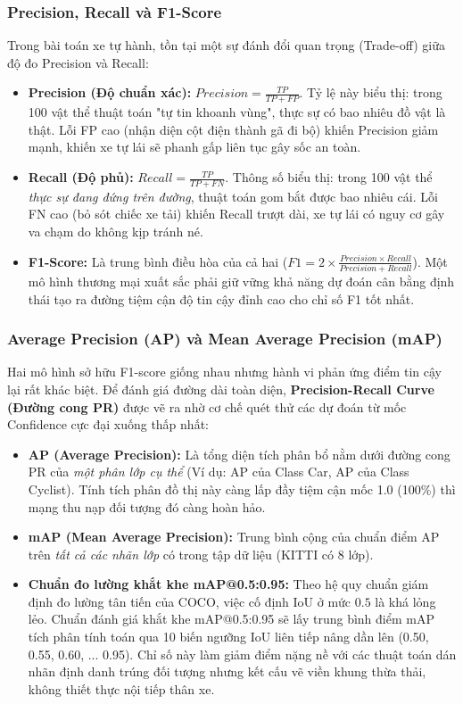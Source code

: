 \documentclass[a4paper]{article}
\theoremstyle{definition}
\begin{document}
\subsubsection{Precision, Recall và F1-Score}
Trong bài toán xe tự hành, tồn tại một sự đánh đổi quan trọng (Trade-off) giữa độ đo Precision và Recall:
\begin{itemize}
	\item \textbf{Precision (Độ chuẩn xác):} $Precision = \frac{TP}{TP + FP}$. Tỷ lệ này biểu thị: trong 100 vật thể thuật toán "tự tin khoanh vùng", thực sự có bao nhiêu đồ vật là thật. Lỗi FP cao (nhận diện cột điện thành gã đi bộ) khiến Precision giảm mạnh, khiến xe tự lái sẽ phanh gấp liên tục gây sốc an toàn.
	\item \textbf{Recall (Độ phủ):} $Recall = \frac{TP}{TP + FN}$. Thông số biểu thị: trong 100 vật thể \textit{thực sự đang đứng trên đường}, thuật toán gom bắt được bao nhiêu cái. Lỗi FN cao (bỏ sót chiếc xe tải) khiến Recall trượt dài, xe tự lái có nguy cơ gây va chạm do không kịp tránh né.
	\item \textbf{F1-Score:} Là trung bình điều hòa của cả hai ($F1 = 2 \times \frac{Precision \times Recall}{Precision + Recall}$). Một mô hình thương mại xuất sắc phải giữ vững khả năng dự đoán cân bằng định thái tạo ra đường tiệm cận độ tin cậy đỉnh cao cho chỉ số F1 tốt nhất.
\end{itemize}

\subsubsection{Average Precision (AP) và Mean Average Precision (mAP)}
Hai mô hình sở hữu F1-score giống nhau nhưng hành vi phản ứng điểm tin cậy lại rất khác biệt. Để đánh giá đường dài toàn diện, \textbf{Precision-Recall Curve (Đường cong PR)} được vẽ ra nhờ cơ chế quét thử các dự đoán từ mốc Confidence cực đại xuống thấp nhất:
\begin{itemize}
	\item \textbf{AP (Average Precision):} Là tổng diện tích phân bổ nằm dưới đường cong PR của \textit{một phân lớp cụ thể} (Ví dụ: AP của Class Car, AP của Class Cyclist). Tính tích phân đồ thị này càng lấp đầy tiệm cận mốc 1.0 (100\%) thì mạng thu nạp đối tượng đó càng hoàn hảo.
	\item \textbf{mAP (Mean Average Precision):} Trung bình cộng của chuẩn điểm AP trên \textit{tất cả các nhãn lớp} có trong tập dữ liệu (KITTI có 8 lớp).
	\item \textbf{Chuẩn đo lường khắt khe mAP@0.5:0.95:} Theo hệ quy chuẩn giám định đo lường tân tiến của COCO, việc cố định IoU ở mức $0.5$ là khá lỏng lẻo. Chuẩn đánh giá khắt khe mAP@0.5:0.95 sẽ lấy trung bình điểm mAP tích phân tính toán qua 10 biến ngưỡng IoU liên tiếp nâng dần lên (0.50, 0.55, 0.60, ... 0.95). Chỉ số này làm giảm điểm nặng nề với các thuật toán dán nhãn định danh trúng đối tượng nhưng kết cấu vẽ viền khung thừa thải, không thiết thực nội tiếp thân xe.
\end{itemize}
\end{document}
